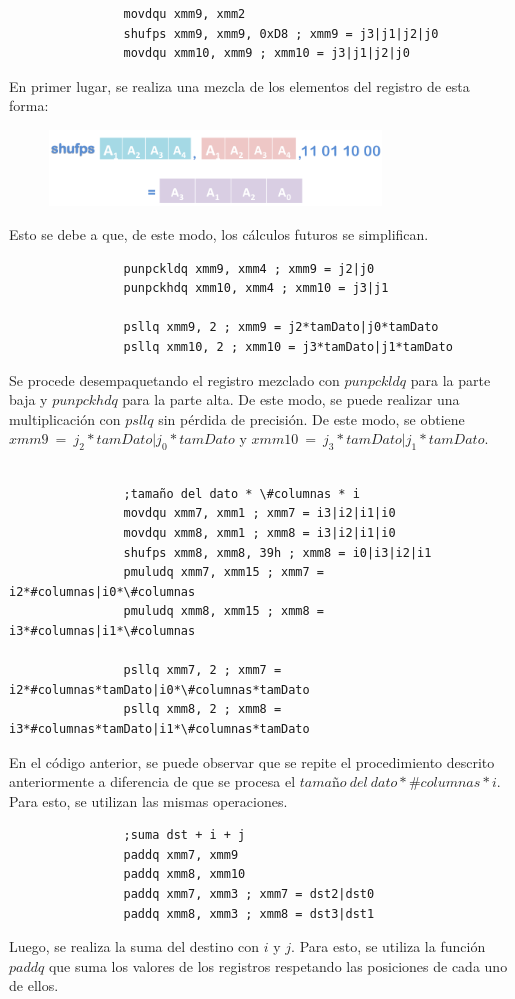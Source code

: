 \documentclass[10pt, a4paper]{article}
\begin{document}
\begin{verbatim}
                movdqu xmm9, xmm2
                shufps xmm9, xmm9, 0xD8 ; xmm9 = j3|j1|j2|j0           
                movdqu xmm10, xmm9 ; xmm10 = j3|j1|j2|j0
\end{verbatim}
En primer lugar, se realiza una mezcla de los elementos del registro de esta forma:
\begin{figure}[H] %
\begin{center}
\includegraphics[width=250pt]{../imgs/sufps.jpg}
\end{center}
\end{figure}
Esto se debe a que, de este modo, los cálculos futuros se simplifican.
\begin{verbatim}           
                punpckldq xmm9, xmm4 ; xmm9 = j2|j0
                punpckhdq xmm10, xmm4 ; xmm10 = j3|j1

                psllq xmm9, 2 ; xmm9 = j2*tamDato|j0*tamDato
                psllq xmm10, 2 ; xmm10 = j3*tamDato|j1*tamDato
\end{verbatim}
Se procede desempaquetando el registro mezclado con $punpckldq$ para la parte baja y $punpckhdq$ para la parte alta. De este modo, se puede realizar una multiplicación con $psllq$ sin pérdida de precisión. De este modo, se obtiene $xmm9\ =\ j_2*tamDato|j_0*tamDato$ y $xmm10\ =\ j_3*tamDato|j_1*tamDato$.
\begin{verbatim}

                ;tamaño del dato * \#columnas * i              
                movdqu xmm7, xmm1 ; xmm7 = i3|i2|i1|i0
                movdqu xmm8, xmm1 ; xmm8 = i3|i2|i1|i0         
                shufps xmm8, xmm8, 39h ; xmm8 = i0|i3|i2|i1
                pmuludq xmm7, xmm15 ; xmm7 = i2*#columnas|i0*\#columnas
                pmuludq xmm8, xmm15 ; xmm8 = i3*#columnas|i1*\#columnas
               
                psllq xmm7, 2 ; xmm7 = i2*#columnas*tamDato|i0*\#columnas*tamDato
                psllq xmm8, 2 ; xmm8 = i3*#columnas*tamDato|i1*\#columnas*tamDato
\end{verbatim}
En el código anterior, se puede observar que se repite el procedimiento descrito anteriormente a diferencia de que se procesa el $tamaño\ del\ dato * \#columnas * i$. Para esto, se utilizan las mismas operaciones.
\begin{verbatim}              
                ;suma dst + i + j
                paddq xmm7, xmm9
                paddq xmm8, xmm10
                paddq xmm7, xmm3 ; xmm7 = dst2|dst0
                paddq xmm8, xmm3 ; xmm8 = dst3|dst1
\end{verbatim}
Luego, se realiza la suma del destino con $i$ y $j$. Para esto, se utiliza la función $paddq$ que suma los valores de los registros respetando las posiciones de cada uno de ellos.
\end{document}
